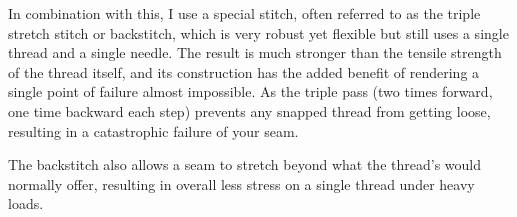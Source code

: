 In combination with this, I use a special stitch, often referred to as the triple stretch stitch or backstitch, which is very robust yet flexible but still uses a single thread and a single needle. The result is much stronger than the tensile strength of the thread itself, and its construction has the added benefit of rendering a single point of failure almost impossible. As the triple pass (two times forward, one time backward each step) prevents any snapped thread from getting loose, resulting in a catastrophic failure of your seam.

The backstitch also allows a seam to stretch beyond what the thread's would normally offer, resulting in overall less stress on a single thread under heavy loads.
